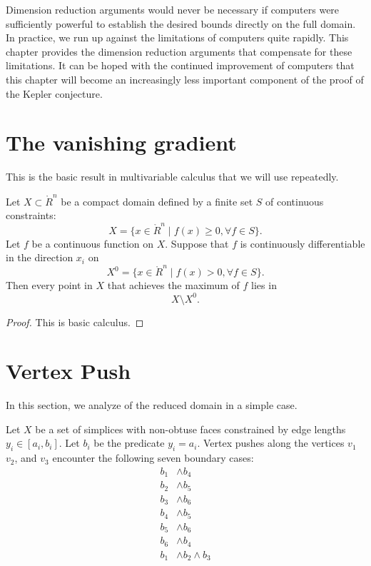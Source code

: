 Dimension reduction arguments would never be necessary if
computers were sufficiently powerful to establish the desired
bounds directly on the full domain.  In practice, we run up
against the limitations of computers quite rapidly.  This chapter
provides the dimension reduction arguments that compensate for
these limitations.  It can be hoped with the continued improvement
of computers that this chapter will become an increasingly less
important component of the proof of the Kepler conjecture.

\section{The vanishing gradient}\label{sec:gradient}

This is the basic result in multivariable calculus that we will
use repeatedly.

\begin{lemma}  Let $X\subset\ring{R}^n$ be a compact domain
defined by a finite set $S$ of continuous constraints:
    $$X =\{x\in\ring{R}^n\mid f(x)\ge 0, \forall f\in S\}.$$
Let $f$ be a continuous function on $X$.  Suppose that $f$ is
continuously differentiable in the direction $x_i$ on
    $$X^0= \{x\in\ring{R}^n\mid f(x) > 0, \forall f\in S\}.$$
Then every point in $X$ that achieves the maximum of $f$ lies in
    $$X \setminus X^0.$$
\end{lemma}

\begin{proof} This is basic calculus.
\end{proof}

\section{Vertex Push}\label{sec:push}

In this section, we analyze of the reduced domain in a simple
case.

\begin{lemma}  Let $X$ be a set of simplices with non-obtuse faces constrained by edge
lengths $y_i\in[a_i,b_i]$.  Let $b_i$ be the predicate $y_i =
a_i$.  Vertex pushes along the vertices $v_1$ $v_2$, and $v_3$
encounter the following seven boundary cases:
    $$
    \begin{array}{rlll}
    b_1 &\land b_4 \\
    b_2 &\land b_5 \\
    b_3 &\land b_6 \\
    b_4 &\land b_5 \\
    b_5 &\land b_6 \\
    b_6 &\land b_4 \\
    b_1 &\land b_2 \land b_3
    \end{array}
    $$
\end{lemma}


